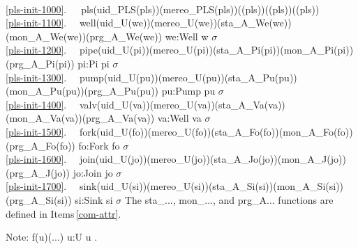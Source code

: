 \bp
{}\\
\ref{pls-init-1000}.\ \ \ pls(uid\_PLS(pls))(mereo\_PLS(pls))((pls))((pls))((pls)) \\
\ref{pls-init-1100}.\ \ {\PARL} {\PARL} {\LBRACE} well(uid\_U(we))(mereo\_U(we))(sta\_A\_We(we))(mon\_A\_We(we))(prg\_A\_We(we)) {\BAR} we:Well {\RDOT} w {\ISIN} $\sigma$ {\RBRACE}\\
\ref{pls-init-1200}.\ \ {\PARL} {\PARL} {\LBRACE} pipe(uid\_U(pi))(mereo\_U(pi))(sta\_A\_Pi(pi))(mon\_A\_Pi(pi))(prg\_A\_Pi(pi)) {\BAR} pi:Pi {\RDOT} pi {\ISIN} $\sigma$ {\RBRACE} \\
\ref{pls-init-1300}.\ \ {\PARL} {\PARL} {\LBRACE} pump(uid\_U(pu))(mereo\_U(pu))(sta\_A\_Pu(pu))(mon\_A\_Pu(pu))(prg\_A\_Pu(pu)) {\BAR} pu:Pump {\RDOT} pu {\ISIN} $\sigma$ {\RBRACE}\ \ \\
\ref{pls-init-1400}.\ \ {\PARL} {\PARL} {\LBRACE} valv(uid\_U(va))(mereo\_U(va))(sta\_A\_Va(va))(mon\_A\_Va(va))(prg\_A\_Va(va)) {\BAR} va:Well {\RDOT} va {\ISIN} $\sigma$ {\RBRACE}\ \ \\
\ref{pls-init-1500}.\ \ {\PARL} {\PARL} {\LBRACE} fork(uid\_U(fo))(mereo\_U(fo))(sta\_A\_Fo(fo))(mon\_A\_Fo(fo))(prg\_A\_Fo(fo)) {\BAR} fo:Fork {\RDOT} fo {\ISIN} $\sigma$ {\RBRACE}\ \ \\
\ref{pls-init-1600}.\ \ {\PARL} {\PARL} {\LBRACE} join(uid\_U(jo))(mereo\_U(jo))(sta\_A\_Jo(jo))(mon\_A\_J(jo))(prg\_A\_J(jo)) {\BAR} jo:Join {\RDOT} jo {\ISIN} $\sigma$ {\RBRACE}\ \ \ \\
\ref{pls-init-1700}.\ \ {\PARL} {\PARL} {\LBRACE} sink(uid\_U(si))(mereo\_U(si))(sta\_A\_Si(si))(mon\_A\_Si(si))(prg\_A\_Si(si)) {\BAR} si:Sink {\RDOT} si {\ISIN} $\sigma$ {\RBRACE}
\ep
\normalsize\HHHH
\noindent
\begynd
\pind The \textsf{sta\_..., mon\_...,} and \textsf{prg\_A...}
      functions are defined in Items\,\vref{com-attr}.

\noindent
\pind Note: \textsf{{\PARL} {\LBRACE} f(u)(...)  {\BAR} u:U {\RDOT} u {\ISIN} {\LBRACE}{\RBRACE} {\RBRACE}} {\IS} \sort{()}.
\afslut
\label{tehran:Examplen}
